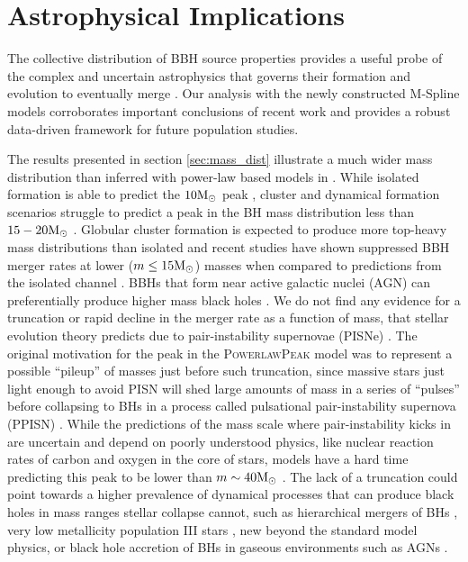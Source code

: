 \section{Astrophysical Implications}\label{sec:astrodiscussion}

The collective distribution of BBH source properties provides a useful probe of the complex and uncertain astrophysics that governs their 
formation and evolution to eventually merge \citep{Zevin_2017}. Our analysis with the newly constructed M-Spline models corroborates important 
conclusions of recent work and provides a robust data-driven framework for future population studies. 

The results presented in section \ref{sec:mass_dist} illustrate a much wider mass distribution than inferred with power-law based models in \citet{o3b_astro_dist}. 
While isolated formation is able to predict the $10{\rm M}_\odot$ peak \citep{Antonini_2020}, cluster and dynamical formation scenarios struggle to predict a peak in the BH mass distribution less than 
$15-20{\rm M}_\odot$ \citep{Hong_2018, Rodriguez_2019}. Globular cluster formation is expected to produce more top-heavy mass distributions than isolated and recent studies have shown suppressed BBH merger rates 
at lower ($m\leq15{\rm M}_\odot$) masses when compared to predictions from the isolated channel \citep{Rodriguez_2015, Rodriguez_2019, BaveraMassTransfer,Belczynski_2016}. BBHs that form near active galactic nuclei (AGN) can preferentially produce higher 
mass black holes \citep{FordAGN, Tagawa_2021, Yang_2019}. We do not find any evidence for a truncation or rapid decline in the merger rate as a function of mass, that stellar evolution theory predicts 
due to pair-instability supernovae (PISNe) \citep{Heger_2002,PISN_Woosley,Heger_2003,Spera_2017}. The original motivation for the peak in the \textsc{PowerlawPeak} model \citep{Talbot_2018} was to represent a possible ``pileup'' of 
masses just before such truncation, since massive stars just light enough to avoid PISN will shed large amounts of mass in a series of ``pulses'' before collapsing to BHs in a process called 
pulsational pair-instability supernova (PPISN) \citep{Woosley_2017,Woosley_2019,Farmer_2019}. While the predictions of the mass scale where pair-instability kicks in are uncertain and depend on poorly understood physics, 
like nuclear reaction rates of carbon and oxygen in the core of stars, models have a hard time predicting this peak to be lower than $m\sim40{\rm M}_\odot$ \citep{Belczynski_2016,Marchant_2019,Renzo_2020,Farmer_2019,Farmer_2020}. The lack of a truncation could 
point towards a higher prevalence of dynamical processes that can produce black holes in mass ranges stellar collapse cannot, such as hierarchical mergers of BHs \citep{Fishbach_2017,Doctor_2020,Kimball_genealogy,kimball2020evidence,doctor2021black,Fishbach_2022}, 
very low metallicity population III stars \citep{Belczynski_2020,Farrell_2020}, new beyond the standard model physics\citep{Croon_newphysics,Sakstein_2020}, or black hole accretion of BHs in gaseous environments such as AGNs \citep{Secunda_2020,McKernan_2020,cruzosorio2021gw190521}. 

